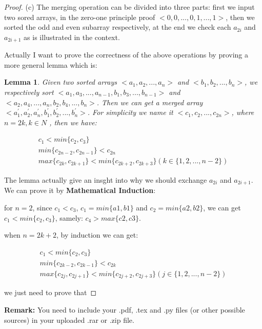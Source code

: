 \documentclass[12pt,a4paper]{article}
\newtheorem{lemma}[theorem]{Lemma}
\theoremstyle{definition}
\begin{document}
\begin{enumerate}
\begin{proof}
	(c) The merging operation can be divided into three parts: first we input two sored arrays, in the zero-one principle proof $<0, 0, ..., 0, 1, ..., 1>$, then we 
	sorted the odd and even subarray respectively, at the end we check each $a_{2i}$ and $a_{2i+1}$ as is illustrated in the context.
	 
	Actually I want to prove the correctness of the above operations by proving a more general lemma which is:
	
	\begin{lemma}
		Given two sorted arrays $<a_1, a_2, ..., a_n>$
		and $<b_1, b_2, ..., b_n>$, we respectively sort 
		$<a_1, a_3, ..., a_{n-1}, b_1, b_3, ..., b_{n-1}>$
		 and 
		$<a_2, a_4, ..., a_n, b_2, b_4, ..., b_n>$. 
		Then we can get a merged array 
		$<a_1^{'}, a_2^{'}, a_n^{'}, b_1^{'}, b_2^{'}, ..., b_n^{'}>$. 
		For simplicity we name it $<c_1, c_2, ..., c_{2n}>$, where $n=2k, k \in N$
	   , then we have:
	   
	   \begin{gather*}
		c_1 < min\{c_2, c_3\} \\
		min\{c_{2n-2}, c_{2n - 1}\} < c_{2n} \\
		max\{c_{2k}, c_{2k+1}\} < min\{c_{2k+2}, c_{2k+3}\} (k \in \{1, 2, ..., n-2\}) 
	   \end{gather*}
	\end{lemma}

	The lemma actually give an insght into why we should exchange $a_{2i}$ and $a_{2i+1}$. We can prove it by \textbf{Mathematical Induction}:

	 for $n = 2$, since $c_1 < c_3$, $c_1 = min\{a1, b1\}$ and $c_2=min\{a2, b2\}$, we can get $c_1 < min\{c_2, c_3\}$, samely: $c_4 > max\{c2, c3\}$.

	 when $n = 2k + 2$, by induction we can get:

	\begin{gather*}
		c_1 < min\{c_2, c_3\} \\
		min\{c_{2k-2}, c_{2k - 1}\} < c_{2k} \\
		max\{c_{2j}, c_{2j+1}\} < min\{c_{2j+2}, c_{2j+3}\} (j \in \{1, 2, ..., n-2\}) 
	\end{gather*}

	
	
	we just need to prove that 



    \end{proof}

\end{enumerate}



\vspace{20pt}

\textbf{Remark:} You need to include your .pdf, .tex and .py files (or other possible sources) in your uploaded .rar or .zip file.

\end{document}
